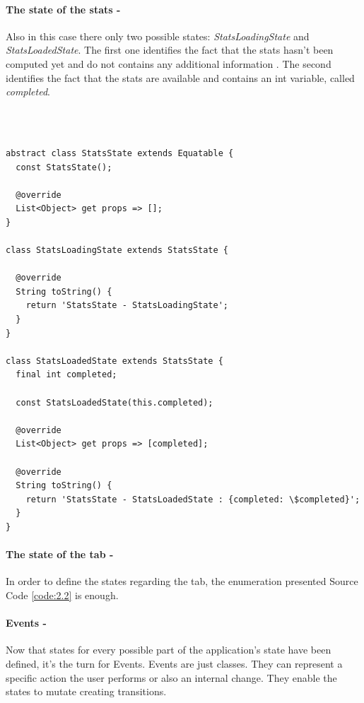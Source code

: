 \paragraph{The state of the stats - }
\label{subpar:todo_app_bloc_core_state}
Also in this case there only two possible states:  \textit{StatsLoadingState} and \textit{StatsLoadedState}. The first one identifies the fact that the stats hasn’t been computed yet and do not contains any additional information . The second identifies the fact that the stats are available and contains an int variable, called \textit{completed}.
\begin{code}
\mbox{}\\
 \mbox{}
\label{code:2.14}
\begin{verbatim}

abstract class StatsState extends Equatable {
  const StatsState();

  @override
  List<Object> get props => [];
}

class StatsLoadingState extends StatsState {

  @override
  String toString() {
    return 'StatsState - StatsLoadingState';
  }
}

class StatsLoadedState extends StatsState {
  final int completed;

  const StatsLoadedState(this.completed);

  @override
  List<Object> get props => [completed];

  @override
  String toString() {
    return 'StatsState - StatsLoadedState : {completed: \$completed}';
  }
}
\end{verbatim}
\mbox{}
\end{code}

\paragraph{The state of the tab - }
\label{subpar:todo_app_bloc_core_state}
In order to define the states regarding the tab, the enumeration presented Source Code \ref{code:2.2} is enough.

\paragraph{Events - }
\label{subpar:todo_app_bloc_core_state}

Now that states for every possible part of the application's state have been defined, it’s the turn for Events. Events are just classes. They can represent a specific action the user performs or also an internal change. They enable the states to mutate creating transitions. 


